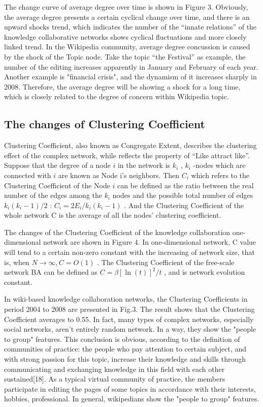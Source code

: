 \documentclass{elsarticle}
\begin{document}
The change curve of average degree over time is shown in Figure 3. Obviously, the average degree presents a certain cyclical change over time, and there is an upward shocks trend, which indicates the number of the “innate relations” of the knowledge collaborative networks shows cyclical fluctuations and more closely linked trend. In the Wikipedia community, average degree concussion is caused by the shock of the Topic node. Take the topic “the Festival” as example, the number of the editing increases apparently in January and February of each year. Another example is "financial crisis", and the dynamism of it increases sharply in 2008. Therefore, the average degree will be showing a shock for a long time, which is closely related to the degree of concern within Wikipedia topic.

\subsection{ The changes of Clustering Coefficient}
\label{sec:chang-clust-coeff}

Clustering Coefficient, also known as Congregate Extent, describes the
clustering effect of the complex network, while reflects the property
of “Like attract like”. Suppose that the degree of a node $i$ in the
network is $k_i$  , $k_i$  -nodes which are connected with $i$ are
known as Node i’s neighbors. Then $C_i$ which refers to the Clustering
Coefficient of the Node $i$ can be defined as the ratio between the
real number of the edges among the $k_i$  nodes and the possible total
number of edges $k_i(k_i-1)/2$ : $C_i=2E_i/k_i(k_i-1)$ . And the
Clustering Coefficient of the whole network C is the average of all
the nodes’ clustering coefficient.

The changes of the Clustering Coefficient of the knowledge
collaboration one-dimensional network are shown in Figure 4. In
one-dimensional network, C value will tend to a certain non-zero
constant with the increasing of network size, that is, when
$N\rightarrow\infty,C=O(1)$ . The Clustering Coefficient of the
free-scale network BA can be defined as $C=\beta[\ln(t)]^2/t$ , and
is network evolution constant.

In wiki-based knowledge collaboration networks, the Clustering Coefficients in period 2004 to 2008 are presented in Fig.3. The result shows that the Clustering Coefficient averages to 0.55. In fact, many types of complex networks, especially social networks, aren’t entirely random network. In a way, they show the "people to group" features. This conclusion is obvious, according to the definition of communities of practice: the people who pay attention to certain subject, and with strong passion for this topic, increase their knowledge and skills through communicating and exchanging knowledge in this field with each other sustained[18]. As a typical virtual community of practice, the members participate in editing the pages of some topics  in accordance with their interests, hobbies, professional. In general, wikipedians show the "people to group" features.
\end{document}

